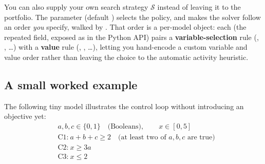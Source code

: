 \begin{platypusparam}[htb]
You can also supply your own search strategy $\mathcal{S}$ instead of leaving it to the
portfolio. The  parameter (default ) selects the policy,
and  makes the solver follow an order \emph{you} specify,
walked by .
That order is a per-model object: each
 (the repeated
 field, exposed as
 in the Python API) pairs a
\textbf{variable-selection} rule (,
, \dots) with a \textbf{value} rule
(, , \dots), letting you
hand-encode a custom variable and value order rather than leaving the choice to
the automatic activity heuristic.
\end{platypusparam}

\subsection{A small worked example}

The following tiny model illustrates the control loop without introducing an
objective yet:
\[
\begin{aligned}
  &a, b, c \in \{0, 1\} \quad\text{(Booleans)}, \qquad x \in [0, 5] \\
  &\text{C1:}\ a + b + c \ge 2 \quad\text{(at least two of } a,b,c \text{ are true)}\\
  &\text{C2:}\ x \ge 3a \\
  &\text{C3:}\ x \le 2
\end{aligned}
\]


